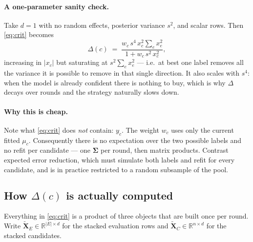 \documentclass[11pt]{article}
\newcommand{\bS}{\bm{\Sigma}}
\newcommand{\bX}{\bm{X}}
\begin{document}
\paragraph{A one-parameter sanity check.} Take $d=1$ with no random effects, posterior variance
$s^2$, and scalar rows. Then \eqref{eq:crit} becomes
\begin{equation}
  \Delta(c) \;=\; \frac{w_c\,s^4\,x_c^2 \sum_e x_e^2}{1 + w_c\,s^2\,x_c^2},
  \label{eq:scalar}
\end{equation}
increasing in $|x_c|$ but saturating at $s^2\sum_e x_e^2$ --- i.e.\ at best one label removes all
the variance it is possible to remove in that single direction. It also scales with $s^4$: when
the model is already confident there is nothing to buy, which is why $\Delta$ decays over rounds
and the strategy naturally slows down.

\paragraph{Why this is cheap.} Note what \eqref{eq:crit} does \emph{not} contain: $y_c$. The
weight $w_c$ uses only the current fitted $\mu_c$. Consequently there is no expectation over the
two possible labels and no refit per candidate --- one $\bS$ per round, then matrix products.
Contrast expected error reduction, which must simulate both labels and refit for every candidate,
and is in practice restricted to a random subsample of the pool.

\subsection{How $\Delta(c)$ is actually computed}
\label{sec:compute}

Everything in \eqref{eq:crit} is a product of three objects that are built once per round. Write
$\tilde{\bX}_E\in\mathbb{R}^{|E|\times d}$ for the stacked evaluation rows and
$\tilde{\bX}_C\in\mathbb{R}^{n\times d}$ for the stacked candidates.
\end{document}
